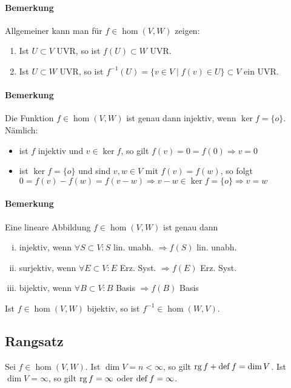 \paragraph{Bemerkung}
	Allgemeiner kann man für $f\in \hom (V,W)$ zeigen:
		\begin{enumerate}
			\item Ist $U\subset V$ UVR, so ist $f(U)\subset W$ UVR.
			\item Ist $U\subset W$ UVR, so ist $f^{-1}(U) = \{v\in V\mid f(v) \in U \}\subset V$ ein UVR.
		\end{enumerate}

\paragraph{Bemerkung}
	Die Funktion $f\in \hom (V,W)$ ist genau dann injektiv, wenn $\ker f = \{o\}$. Nämlich:
		\begin{itemize}
			\item ist $f$ injektiv und $v\in \ker f$, so gilt $f(v) = 0 = f(0) \Rightarrow v=0$
			\item ist $\ker f = \{ o \}$ und sind $v,w \in V$ mit $f(v) = f(w)$, so folgt\\
				$0=f(v)-f(w) = f(v-w) \Rightarrow v-w\in \ker f = \{o\} \Rightarrow v = w$
		\end{itemize}

\paragraph{Bemerkung}
	Eine lineare Abbildung $ f\in \hom (V,W) $ ist genau dann
		\begin{enumerate}[(i)]
			\item injektiv, wenn $ \forall S\subset V: S$ lin. unabh. $ \Rightarrow f(S) $ lin. unabh.
			\item surjektiv, wenn $ \forall E \subset V:E $ Erz. Syst. $ \Rightarrow f(E)$ Erz. Syst.
			\item bijektiv, wenn $ \forall B\subset V: B$ Basis $ \Rightarrow f(B)$ Basis
		\end{enumerate}

	Ist $ f\in \hom (V,W) $ bijektiv, so ist $ f^{-1}\in \hom (W,V) $.

\subsection{Rangsatz}
	\begin{Satz}[Rangsatz]
		Sei $ f\in \hom (V,W) $. Ist $ \dim V = n < \infty $,  so gilt $\operatorname{rg} f + \operatorname{def} f = \dim V$.  Ist $ \dim V = \infty $, so gilt $ \operatorname{rg} f = \infty $ oder $ \operatorname{def} f = \infty $.
	\end{Satz}

